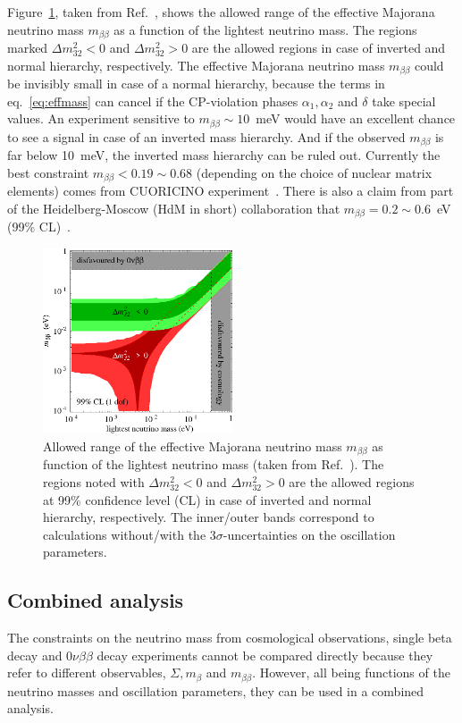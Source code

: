 Figure~\ref{fig:m2bVSlightest}, taken from Ref.~\cite{Str05}, shows the allowed range of the effective Majorana neutrino mass $m_{\beta\beta}$ as a function of the lightest neutrino mass. The regions marked $\Delta m^{2}_{32}<0$ and $\Delta m^{2}_{32}>0$ are the allowed regions in case of inverted and normal hierarchy, respectively. The effective Majorana neutrino mass $m_{\beta\beta}$ could be invisibly small in case of a normal hierarchy, because the terms in eq.~\ref{eq:effmass} can cancel if the CP-violation phases $\alpha_{1}, \alpha_{2}$ and $\delta$ take special values. An experiment sensitive to $ m_{\beta\beta} \sim 10$~meV would have an excellent chance to see a signal in case of an inverted mass hierarchy. And if the observed $m_{\beta\beta}$ is far below 10~meV, the inverted mass hierarchy can be ruled out. Currently the best constraint $m_{\beta\beta}<0.19 \sim 0.68$ (depending on the choice of nuclear matrix elements) comes from CUORICINO experiment~\cite{Cuo08}. There is also a claim from part of the Heidelberg-Moscow (HdM in short) collaboration that $m_{\beta\beta} = 0.2 \sim 0.6$~eV (99\% CL)~\cite{Hei04}.
\begin{figure}[tbhp]
  \centering
  \includegraphics[width=0.5\textwidth]{m2bVSlightest}  
  \caption{Allowed range of the effective Majorana neutrino mass     $m_{\beta\beta}$ as function of the lightest neutrino mass (taken     from Ref.~\cite{Str05}). The regions noted with $\Delta     m^{2}_{32}<0$ and $\Delta m^{2}_{32}>0$ are the allowed regions at     99\% confidence level (CL) in case of inverted and normal     hierarchy, respectively. The inner/outer bands correspond to     calculations without/with the $3 \sigma$-uncertainties on the     oscillation parameters.}
  \label{fig:m2bVSlightest}
\end{figure}

\subsection{Combined analysis}
\label{sec:joian}
The constraints on the neutrino mass from cosmological observations, single beta decay and $0\nu\beta\beta$ decay experiments cannot be compared directly because they refer to different observables, $\Sigma, m_{\beta}$ and $m_{\beta\beta}$. However, all being functions of the neutrino masses and oscillation parameters, they can be used in a combined analysis. 

